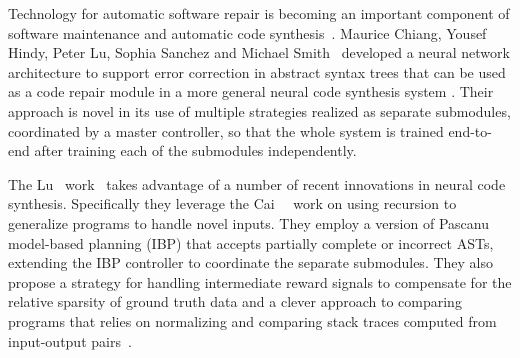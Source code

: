 
Technology for automatic software repair is becoming an important component of software maintenance and automatic code synthesis~\cite{MonperrusACM-17}. Maurice Chiang, Yousef Hindy, Peter Lu, Sophia Sanchez and Michael Smith~\cite{CS379C_Final_Project_Luetal-18} developed a neural network architecture to support error correction in abstract syntax trees that can be used as a code repair module in a more general neural code synthesis system {}. Their approach is novel in its use of multiple strategies realized as separate submodules, coordinated by a master controller, so that the whole system is trained end-to-end after training each of the submodules independently. 

The Lu~\etal{} work~\cite{CS379C_Final_Project_Luetal-18} takes advantage of a number of recent innovations in neural code synthesis. Specifically they leverage the Cai~\etal{}~\cite{CaietalICLR-17} work on using recursion to generalize programs to handle novel inputs. They employ a version of Pascanu~\etal{}~\cite{PascanuetalCoRR-17} model-based planning (IBP) that accepts partially complete or incorrect ASTs, extending the IBP controller to coordinate the separate submodules. They also propose a strategy for handling intermediate reward signals to compensate for the relative sparsity of ground truth data and a clever approach to comparing programs that relies on normalizing and comparing stack traces computed from input-output pairs~\cite{BrodieetalICAC-05,GuptaetalPATENT-06,SmithandWatermanJMB-81}. 

